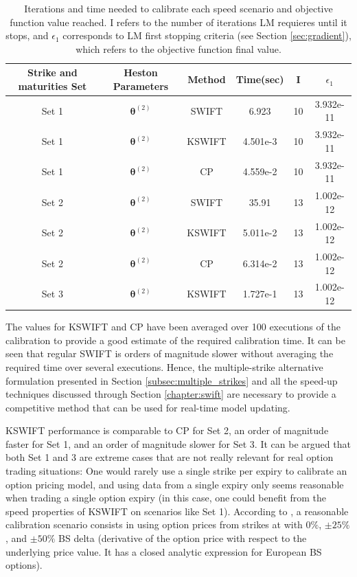 \documentclass[12,twoside]{mammeTFM}
\theoremstyle{definition}
\theoremstyle{remark}
\begin{document}
\begin{table}[!h]
\begin{center}
 \begin{tabular}{|c | c | c | c | c | c |} 
 \hline
 Strike and maturities Set & Heston Parameters & Method & Time(sec) & I & $\epsilon_1$ \\ [0.5ex] 
 \hline
 Set 1 & $\boldsymbol{\theta}^{(2)}$ & SWIFT & 6.923 & 10 & 3.932e-11 \\ 
 \hline
 Set 1 & $\boldsymbol{\theta}^{(2)}$ & KSWIFT & 4.501e-3 & 10 & 3.932e-11 \\
 \hline
 Set 1 & $\boldsymbol{\theta}^{(2)}$ & CP & 4.559e-2 & 10 & 3.932e-11 \\
 \hline
 Set 2 & $\boldsymbol{\theta}^{(2)}$ & SWIFT & 35.91 & 13 & 1.002e-12 \\
 \hline
 Set 2 & $\boldsymbol{\theta}^{(2)}$ & KSWIFT & 5.011e-2 & 13 & 1.002e-12 \\
 \hline
 Set 2 & $\boldsymbol{\theta}^{(2)}$ & CP & 6.314e-2 & 13 & 1.002e-12 \\
 \hline
 Set 3 & $\boldsymbol{\theta}^{(2)}$ & KSWIFT  & 1.727e-1 & 13 & 1.002e-12\\
 \hline
\end{tabular}
\caption{Iterations and time needed to calibrate each speed scenario and objective function value reached. I refers to the number of iterations LM requieres until it stops, and $\epsilon_1$ corresponds to LM first stopping criteria (see Section \ref{sec:gradient}), which refers to the objective function final value.}\label{table:speed}
\end{center}
\end{table}

The values for KSWIFT and CP have been averaged over 100 executions of the calibration to provide a good estimate of the required calibration time. It can be seen that regular SWIFT is orders of magnitude slower without averaging the required time over several executions. Hence, the multiple-strike alternative formulation presented in Section \ref{subsec:multiple_strikes} and all the speed-up techniques discussed through Section \ref{chapter:swift} are necessary to provide a competitive method that can be used for real-time model updating.

KSWIFT performance is comparable to CP for Set 2, an order of magnitude faster for Set 1, and an order of magnitude slower for Set 3. It can be argued that both Set 1 and 3 are extreme cases that are not really relevant for real option trading situations: One would rarely use a single strike per expiry to calibrate an option pricing model, and using data from a single expiry only seems reasonable when trading a single option expiry (in this case, one could benefit from the speed properties of KSWIFT on scenarios like Set 1). According to \cite{cui17}, a reasonable calibration scenario consists in using option prices from strikes at with $0\%$, $\pm 25\%$, and $\pm 50\%$ BS delta (derivative of the option price with respect to the underlying price value. It has a closed analytic expression for European BS options).
\end{document}
